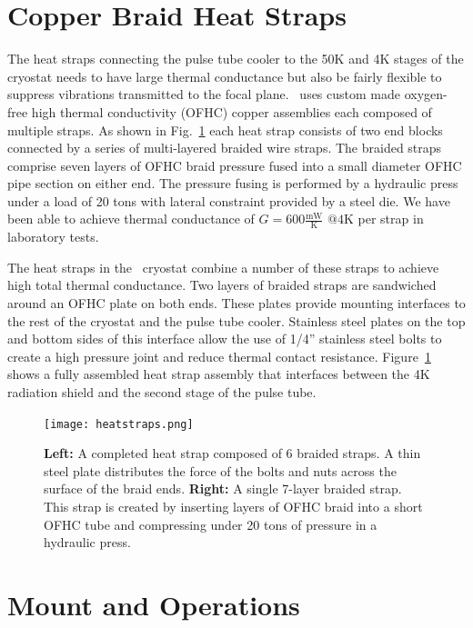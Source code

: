 \documentclass[]{spie}  %
\begin{document}
\section{Copper Braid Heat Straps}

The heat straps connecting the pulse tube cooler to the 50K and 4K stages of
the cryostat needs to have large thermal conductance but also be fairly
flexible to suppress vibrations transmitted to the focal plane. \biceparray\ 
uses custom made oxygen-free high thermal conductivity (OFHC) copper
assemblies each composed of multiple straps. As shown
in Fig.~\ref{fig:heatstrap} each heat strap consists of two end blocks
connected by a series of multi-layered braided wire straps. The braided straps
comprise seven layers of OFHC braid pressure fused into a small diameter OFHC
pipe section on either end. The pressure fusing is performed by a hydraulic
press under a load of 20 tons with lateral constraint provided by a steel
die. We have been able to achieve thermal conductance of $G=600
\frac{\text{mW}}{\text{K}} \text{  @}4\text{K}$ per strap in laboratory tests.

The heat straps in the \biceparray\ cryostat combine a number of these straps
to achieve high total thermal conductance. Two layers of braided straps are
sandwiched around an OFHC plate on both ends. These plates provide mounting
interfaces to the rest of the cryostat and the pulse tube cooler. Stainless
steel plates on the top and bottom sides of this interface allow the use of
1/4'' stainless steel bolts to create a high pressure joint and reduce thermal
contact resistance. Figure~\ref{fig:heatstrap} shows a fully assembled heat
strap assembly that interfaces between the 4K radiation shield and the second
stage of the pulse tube.

\clearpage


\begin{figure}[ht]
\center
\texttt{[image: heatstraps.png]}
\caption{\textbf{Left:} A completed heat strap composed of 6 braided straps. A thin steel plate distributes the force of the bolts and nuts across the surface of the braid ends. \textbf{Right:} A single 7-layer braided strap. This strap is created by inserting layers of OFHC braid into a short OFHC tube and compressing under 20 tons of pressure in a hydraulic press.}
\label{fig:heatstrap}
\end{figure}


\section{Mount and Operations}
\end{document}
